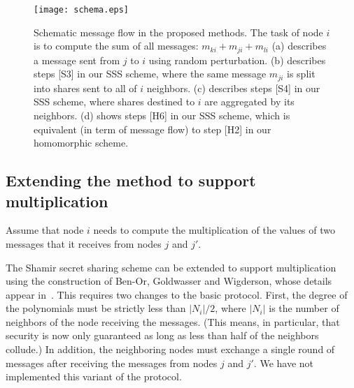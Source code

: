 \documentclass[times, 10pt,twocolumn]{article}
\begin{document}


\begin{figure}
\texttt{[image: schema.eps]}\\
  \caption{Schematic message flow in the proposed methods. The task of node $i$ is to compute the sum of all messages: $m_{ki} + m_{ji} + m_{li}$ (a) describes a message sent from $j$ to $i$ using random perturbation.
  (b) describes steps [S3] in our SSS scheme, where the same message $m_{ji}$ is split into shares sent to all of $i$ neighbors.
  (c) describes steps [S4] in our SSS scheme, where shares destined to $i$ are aggregated by its neighbors. (d) shows steps [H6] in our SSS scheme,
    which is equivalent (in term of message flow) to step [H2] in our homomorphic scheme. }\label{dimes}
\end{figure}

\subsection{Extending the method to support multiplication}

Assume  that node $i$ needs to compute the multiplication of the
values of  two messages that it receives from nodes $j$ and $j'$.
 The Shamir secret sharing scheme
can be extended to support multiplication using the construction
of Ben-Or, Goldwasser and Wigderson, whose details appear
in~\cite{BGW}. This requires two changes to the basic protocol.
First, the degree of the polynomials must be strictly less than
$|N_i|/2$, where $|N_i|$ is the number of neighbors of the node receiving
the messages. (This means, in particular, that security is now
only guaranteed as long as less than half of the neighbors
collude.) In addition, the neighboring nodes must exchange a
single round of messages after receiving the messages from nodes
$j$ and $j'$.
We have not implemented this variant of the protocol.
\end{document}
